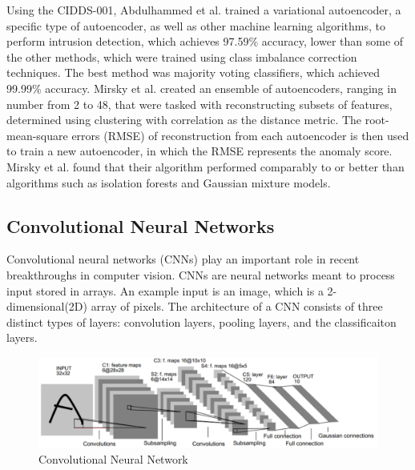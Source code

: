 \documentclass[conference]{IEEEtran}
\begin{document}
Using the CIDDS-001, Abdulhammed et al. \cite{abdulhammed2019deep} trained a variational autoencoder, a specific type of autoencoder, as well as other machine learning algorithms, to perform intrusion detection, which achieves 97.59\% accuracy, lower than some of the other methods, which were trained using class imbalance correction techniques. The best method was majority voting classifiers, which achieved 99.99\% accuracy. Mirsky et al. \cite{mirsky2018kitsune} created an ensemble of autoencoders, ranging in number from 2 to 48, that were tasked with reconstructing subsets of features, determined using clustering with correlation as the distance metric. The root-mean-square errors (RMSE) of reconstruction from each autoencoder is then used to train a new autoencoder, in which the RMSE represents the anomaly score. Mirsky et al. found that their algorithm performed comparably to or better than algorithms such as isolation forests and Gaussian mixture models.

\subsection{Convolutional Neural Networks}
\label{sec:cnn}
Convolutional neural networks (CNNs) play an important role in recent breakthroughs in computer vision. CNNs are neural networks meant to process input stored in arrays. An example input is an image, which is a 2-dimensional(2D) array of pixels. The architecture of a CNN consists of three distinct types of layers: convolution layers, pooling layers, and the classificaiton layers.


\begin{figure}[ht]
\centering
\includegraphics[scale=0.22]{pictures/CNN.PNG}
\caption{Convolutional Neural Network}
\label{fig:cnn}
\end{figure}
\end{document}
